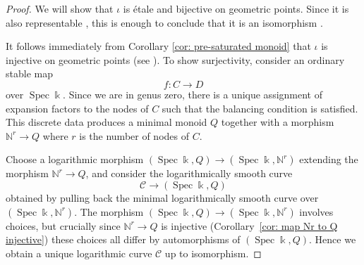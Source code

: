 \documentclass[11pt]{amsart}
\theoremstyle{definition}
\theoremstyle{definition}
\newcommand{\N}{\mathbb{N}}
\newcommand{\Speck}{\operatorname{Spec}\kfield}
\newcommand{\kfield}{\Bbbk}
\newcommand{\Ccal}{\mathcal{C}}
\begin{document}
\begin{proof} We will show that $\iota$ is \'etale and bijective on geometric points. Since it is also representable \cite[Theorem 1.2.1]{ChenLog}, this is enough to conclude that it is an isomorphism \cite[Tag 02LC]{Stacks}.

It follows immediately from Corollary \ref{cor: pre-saturated monoid} that $\iota$ is injective on geometric points (see \cite[\S 3.7]{ChenLog}). To show surjectivity, consider an ordinary stable map
\begin{equation*} f \colon C \to D \end{equation*}
over $\Speck$. Since we are in genus zero, there is a unique assignment of expansion factors to the nodes of $C$ such that the balancing condition is satisfied. This discrete data produces a minimal monoid $Q$ together with a morphism $\N^r \to Q$ where $r$ is the number of nodes of $C$.

Choose a logarithmic morphism $(\Speck,Q) \to (\Speck,\N^r)$ extending the morphism $\N^r \to Q$, and consider the logarithmically smooth curve
\begin{equation*} \Ccal \to (\Speck,Q) \end{equation*}
obtained by pulling back the minimal logarithmically smooth curve over $(\Speck,\N^r)$. The morphism $(\Speck,Q) \to (\Speck,\N^r)$ involves choices, but crucially since $\N^r \to Q$ is injective (Corollary~\ref{cor: map Nr to Q injective}) these choices  all differ by automorphisms of $(\Speck,Q)$. Hence we obtain a unique logarithmic curve $\Ccal$ up to isomorphism.


\end{proof}
\end{document}
